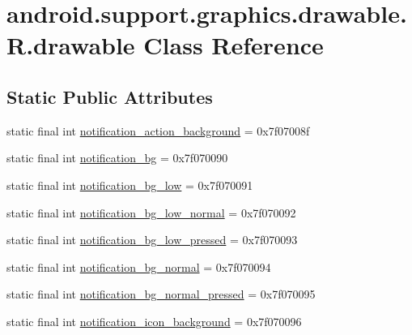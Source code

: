 \hypertarget{classandroid_1_1support_1_1graphics_1_1drawable_1_1R_1_1drawable}{}\section{android.\+support.\+graphics.\+drawable.\+R.\+drawable Class Reference}
\label{classandroid_1_1support_1_1graphics_1_1drawable_1_1R_1_1drawable}
\subsection*{Static Public Attributes}
\begin{DoxyCompactItemize}
\item 
static final int \mbox{\hyperlink{classandroid_1_1support_1_1graphics_1_1drawable_1_1R_1_1drawable_a406ec3cf68ebdc6af7c204f382d49b19}{notification\+\_\+action\+\_\+background}} = 0x7f07008f
\item 
static final int \mbox{\hyperlink{classandroid_1_1support_1_1graphics_1_1drawable_1_1R_1_1drawable_af5fd5e375a2f7e28740270ae167381fd}{notification\+\_\+bg}} = 0x7f070090
\item 
static final int \mbox{\hyperlink{classandroid_1_1support_1_1graphics_1_1drawable_1_1R_1_1drawable_a3e29d11ded19247c205235d18d5a5435}{notification\+\_\+bg\+\_\+low}} = 0x7f070091
\item 
static final int \mbox{\hyperlink{classandroid_1_1support_1_1graphics_1_1drawable_1_1R_1_1drawable_a13c8698f9438958ffcb58dd92355d0fb}{notification\+\_\+bg\+\_\+low\+\_\+normal}} = 0x7f070092
\item 
static final int \mbox{\hyperlink{classandroid_1_1support_1_1graphics_1_1drawable_1_1R_1_1drawable_a78dde7772b5ff823a2443632948f07bb}{notification\+\_\+bg\+\_\+low\+\_\+pressed}} = 0x7f070093
\item 
static final int \mbox{\hyperlink{classandroid_1_1support_1_1graphics_1_1drawable_1_1R_1_1drawable_a48297e7e7d80122ef6353048d4a59eb8}{notification\+\_\+bg\+\_\+normal}} = 0x7f070094
\item 
static final int \mbox{\hyperlink{classandroid_1_1support_1_1graphics_1_1drawable_1_1R_1_1drawable_ae12eab972ee6c7697d3c8248b9507af6}{notification\+\_\+bg\+\_\+normal\+\_\+pressed}} = 0x7f070095
\item 
static final int \mbox{\hyperlink{classandroid_1_1support_1_1graphics_1_1drawable_1_1R_1_1drawable_aa9a6bfdcafe1f6d70796fcfe6e622eeb}{notification\+\_\+icon\+\_\+background}} = 0x7f070096

\end{DoxyCompactItemize}
